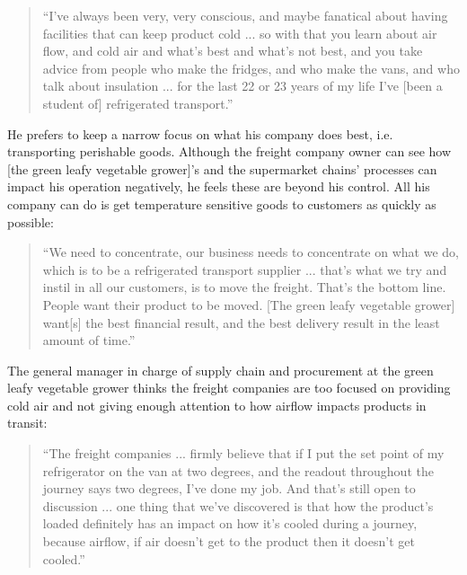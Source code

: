 \begin{quote}
\small
\enquote{I've always been very, very conscious, and maybe fanatical about having facilities that can keep product cold ... so with that you learn about air flow, and cold air and what's best and what’s not best, and you take advice from people who make the fridges, and who make the vans, and who talk about insulation ... for the last 22 or 23 years of my life I've [been a student of] refrigerated transport.} \\
\end{quote}

He prefers to keep a narrow focus on what his company does best, i.e. transporting perishable goods. Although the freight company owner can see how [the green leafy vegetable grower]'s and the supermarket chains' processes can impact his operation negatively, he feels these are beyond his control. All his company can do is get temperature sensitive goods to customers as quickly as possible:  

\begin{quote}
\small
\enquote{We need to concentrate, our business needs to concentrate on what we do, which is to be a refrigerated transport supplier ... that's what we try and instil in all our customers, is to move the freight. That's the bottom line. People want their product to be moved. [The green leafy vegetable grower] want[s] the best financial result, and the best delivery result in the least amount of time.} \\
\end{quote}

The general manager in charge of supply chain and procurement at the green leafy vegetable grower thinks the freight companies are too focused on providing cold air and not giving enough attention to how airflow impacts products in transit:

\begin{quote}
\small
\enquote{The freight companies ... firmly believe that if I put the set point of my refrigerator on the van at two degrees, and the readout throughout the journey says two degrees, I've done my job. And that's still open to discussion ... one thing that we've discovered is that how the product's loaded definitely has an impact on how it's cooled during a journey, because airflow, if air doesn't get to the product then it doesn't get cooled.} \\
\end{quote}

